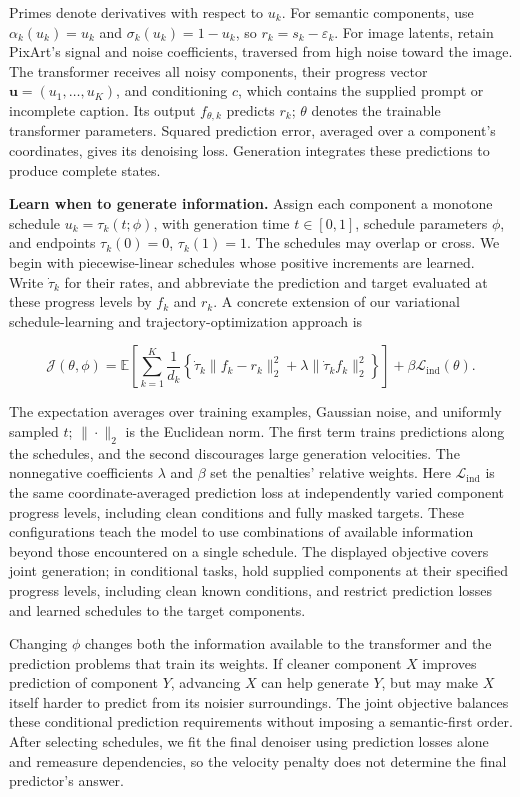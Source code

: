 \documentclass[11pt,letterpaper]{article}
\begin{document}
Primes denote derivatives with respect to \(u_k\). For semantic components, use \(\alpha_k(u_k)=u_k\) and \(\sigma_k(u_k)=1-u_k\), so \(r_k=s_k-\varepsilon_k\). For image latents, retain PixArt's signal and noise coefficients, traversed from high noise toward the image. The transformer receives all noisy components, their progress vector \(\mathbf u=(u_1,\ldots,u_K)\), and conditioning \(c\), which contains the supplied prompt or incomplete caption. Its output \(f_{\theta,k}\) predicts \(r_k\); \(\theta\) denotes the trainable transformer parameters. Squared prediction error, averaged over a component's coordinates, gives its denoising loss. Generation integrates these predictions to produce complete states.

\textbf{Learn when to generate information.} Assign each component a monotone schedule \(u_k=\tau_k(t;\phi)\), with generation time \(t\in[0,1]\), schedule parameters \(\phi\), and endpoints \(\tau_k(0)=0\), \(\tau_k(1)=1\). The schedules may overlap or cross. We begin with piecewise-linear schedules whose positive increments are learned. Write \(\dot\tau_k\) for their rates, and abbreviate the prediction and target evaluated at these progress levels by \(f_k\) and \(r_k\). A concrete extension of our variational schedule-learning \citep{schedule} and trajectory-optimization \citep{trajectory} approach is

\[
\mathcal J(\theta,\phi)
=\mathbb E\!\left[\sum_{k=1}^{K}\frac{1}{d_k}
\left\{\dot\tau_k\|f_k-r_k\|_2^2
+\lambda\|\dot\tau_k f_k\|_2^2\right\}\right]
+\beta\mathcal L_{\mathrm{ind}}(\theta).
\]

The expectation averages over training examples, Gaussian noise, and uniformly sampled \(t\); \(\|\cdot\|_2\) is the Euclidean norm. The first term trains predictions along the schedules, and the second discourages large generation velocities. The nonnegative coefficients \(\lambda\) and \(\beta\) set the penalties' relative weights. Here \(\mathcal L_{\mathrm{ind}}\) is the same coordinate-averaged prediction loss at independently varied component progress levels, including clean conditions and fully masked targets. These configurations teach the model to use combinations of available information beyond those encountered on a single schedule. The displayed objective covers joint generation; in conditional tasks, hold supplied components at their specified progress levels, including clean known conditions, and restrict prediction losses and learned schedules to the target components.

Changing \(\phi\) changes both the information available to the transformer and the prediction problems that train its weights. If cleaner component \(X\) improves prediction of component \(Y\), advancing \(X\) can help generate \(Y\), but may make \(X\) itself harder to predict from its noisier surroundings. The joint objective balances these conditional prediction requirements without imposing a semantic-first order. After selecting schedules, we fit the final denoiser using prediction losses alone and remeasure dependencies, so the velocity penalty does not determine the final predictor's answer.
\end{document}
